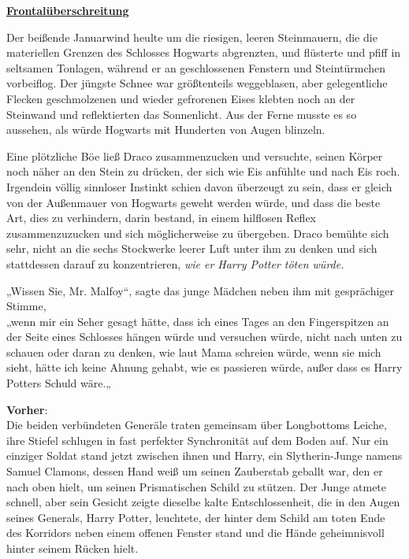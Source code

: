 

\hypertarget{frontaluxfcberschreitungen}{%

\textbf{\uline{Frontalüberschreitung}}

\hfill\break Der beißende Januarwind heulte um die riesigen, leeren Steinmauern, die die materiellen Grenzen des Schlosses Hogwarts abgrenzten, und flüsterte und pfiff in seltsamen Tonlagen, während er an geschlossenen Fenstern und Steintürmchen vorbeiflog. Der jüngste Schnee war größtenteils weggeblasen, aber gelegentliche Flecken geschmolzenen und wieder gefrorenen Eises klebten noch an der Steinwand und reflektierten das Sonnenlicht. Aus der Ferne musste es so aussehen, als würde Hogwarts mit Hunderten von Augen blinzeln.

Eine plötzliche Böe ließ Draco zusammenzucken und versuchte, seinen Körper noch näher an den Stein zu drücken, der sich wie Eis anfühlte und nach Eis roch. Irgendein völlig sinnloser Instinkt schien davon überzeugt zu sein, dass er gleich von der Außenmauer von Hogwarts geweht werden würde, und dass die beste Art, dies zu verhindern, darin bestand, in einem hilflosen Reflex zusammenzuzucken und sich möglicherweise zu übergeben. Draco bemühte sich sehr, nicht an die sechs Stockwerke leerer Luft unter ihm zu denken und sich stattdessen darauf zu konzentrieren, \emph{wie er Harry Potter töten würde.}

„Wissen Sie, Mr. Malfoy“, sagte das junge Mädchen neben ihm mit gesprächiger Stimme,\\ „wenn mir ein Seher gesagt hätte, dass ich eines Tages an den Fingerspitzen an der Seite eines Schlosses hängen würde und versuchen würde, nicht nach unten zu schauen oder daran zu denken, wie laut Mama schreien würde, wenn sie mich sieht, hätte ich keine Ahnung gehabt, wie es passieren würde, außer dass es Harry Potters Schuld wäre.„

\textbf{Vorher}:\\ Die beiden verbündeten Generäle traten gemeinsam über Longbottoms Leiche, ihre Stiefel schlugen in fast perfekter Synchronität auf dem Boden auf. Nur ein einziger Soldat stand jetzt zwischen ihnen und Harry, ein Slytherin-Junge namens Samuel Clamons, dessen Hand weiß um seinen Zauberstab geballt war, den er nach oben hielt, um seinen Prismatischen Schild zu stützen. Der Junge atmete schnell, aber sein Gesicht zeigte dieselbe kalte Entschlossenheit, die in den Augen seines Generals, Harry Potter, leuchtete, der hinter dem Schild am toten Ende des Korridors neben einem offenen Fenster stand und die Hände geheimnisvoll hinter seinem Rücken hielt.

}
